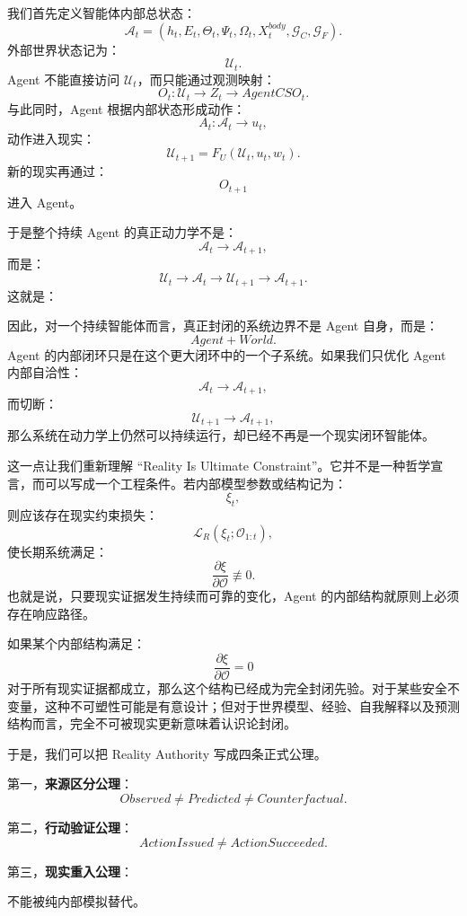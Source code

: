 我们首先定义智能体内部总状态：
\[
\mathcal A_t
=
(
h_t,
E_t,
\Theta_t,
\Psi_t,
\Omega_t,
X_t^{body},
\mathcal G_C,
\mathcal G_F
).
\]
外部世界状态记为：
\[
\mathcal U_t.
\]
Agent 不能直接访问 $\mathcal U_t$，而只能通过观测映射：
\[
O_t:
\mathcal U_t
\rightarrow
Z_t
\rightarrow
AgentCSO_t.
\]
与此同时，Agent 根据内部状态形成动作：
\[
A_t:
\mathcal A_t
\rightarrow
u_t,
\]
动作进入现实：
\[
\mathcal U_{t+1}
=
F_U
(
\mathcal U_t,
u_t,
w_t
).
\]
新的现实再通过：
\[
O_{t+1}
\]
进入 Agent。

于是整个持续 Agent 的真正动力学不是：
\[
\mathcal A_t
\rightarrow
\mathcal A_{t+1},
\]
而是：
\[
\boxed{
\mathcal U_t
\rightarrow
\mathcal A_t
\rightarrow
\mathcal U_{t+1}
\rightarrow
\mathcal A_{t+1}.
}
\]
这就是：
\begin{statementbox}
\centering
{}
\end{statementbox}

因此，对一个持续智能体而言，真正封闭的系统边界不是 Agent 自身，而是：
\[
\boxed{
Agent+World.
}
\]
Agent 的内部闭环只是在这个更大闭环中的一个子系统。如果我们只优化 Agent 内部自洽性：
\[
\mathcal A_t\rightarrow\mathcal A_{t+1},
\]
而切断：
\[
\mathcal U_{t+1}\rightarrow\mathcal A_{t+1},
\]
那么系统在动力学上仍然可以持续运行，却已经不再是一个现实闭环智能体。

这一点让我们重新理解 ``Reality Is Ultimate Constraint''。它并不是一种哲学宣言，而可以写成一个工程条件。若内部模型参数或结构记为：
\[
\xi_t,
\]
则应该存在现实约束损失：
\[
\mathcal L_R(\xi_t;\mathcal O_{1:t}),
\]
使长期系统满足：
\[
\boxed{
\frac{\partial \xi}{\partial \mathcal O}
\not\equiv0.
}
\]
也就是说，只要现实证据发生持续而可靠的变化，Agent 的内部结构就原则上必须存在响应路径。

如果某个内部结构满足：
\[
\frac{\partial \xi}{\partial \mathcal O}
=0
\]
对于所有现实证据都成立，那么这个结构已经成为完全封闭先验。对于某些安全不变量，这种不可塑性可能是有意设计；但对于世界模型、经验、自我解释以及预测结构而言，完全不可被现实更新意味着认识论封闭。

于是，我们可以把 Reality Authority 写成四条正式公理。

第一，\textbf{来源区分公理}：
\[
\boxed{
Observed
\neq
Predicted
\neq
Counterfactual.
}
\]

第二，\textbf{行动验证公理}：
\[
\boxed{
ActionIssued
\neq
ActionSucceeded.
}
\]

第三，\textbf{现实重入公理}：
\begin{statementbox}
\centering
{}
\end{statementbox}
不能被纯内部模拟替代。


